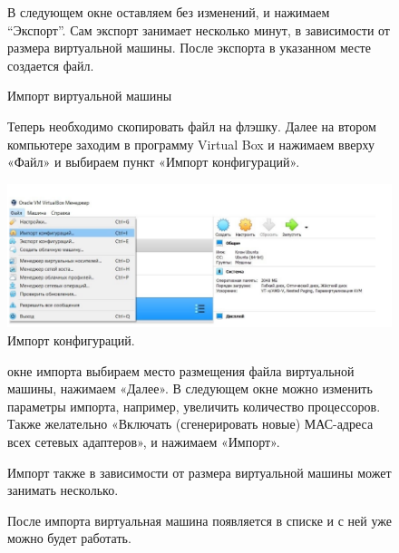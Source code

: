 \begin{figure}
\quad В следующем окне оставляем без изменений, и нажимаем “Экспорт”. Сам экспорт занимает несколько минут, в зависимости от размера виртуальной машины. После экспорта в указанном месте создается файл.
\end{figure}

\begin{figure}
\centering
Импорт виртуальной машины
\label{ris:image}
\end{figure}

\begin{figure}
\quad Теперь необходимо скопировать файл на флэшку. Далее на втором компьютере заходим в программу Virtual Box и нажимаем вверху «Файл» и выбираем пункт «Импорт конфигураций».

\centering
		\includegraphics[width=0.65\linewidth]{img/14.png}
\caption{Импорт конфигураций.}
\label{ris:image}
\end{figure}

\begin{figure}
 окне импорта выбираем место размещения файла виртуальной машины, нажимаем «Далее». В следующем окне можно изменить параметры импорта, например, увеличить количество процессоров. Также желательно «Включать (сгенерировать новые) МАС-адреса всех сетевых адаптеров», и нажимаем «Импорт».
\end{figure}

\begin{figure}
\quad Импорт также в зависимости от размера виртуальной машины может занимать несколько.
\end{figure}

\begin{figure}
\quad После импорта виртуальная машина появляется в списке и с ней уже можно будет работать.
\end{figure}

